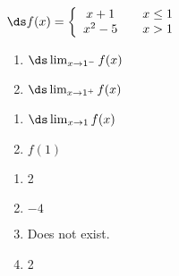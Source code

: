 {$\ds f(x) = \left\{\begin{array}{ccc}
	x+1 & & x\leq 1 \\
	x^2-5 & & x>1
	\end{array}
	\right.
$

\noindent\begin{minipage}[t]{.5\linewidth}
\begin{enumerate}
\item		$\ds \lim_{x\to 1^-} f(x)$
\item		$\ds \lim_{x\to 1^+} f(x)$
\end{enumerate}
\end{minipage}
\noindent\begin{minipage}[t]{.5\linewidth}
\begin{enumerate}\addtocounter{enumii}{2}
\item		$\ds \lim_{x\to 1} f(x)$
\item		$f(1)$\end{enumerate}
\end{minipage}
}
{\begin{enumerate}
\item		2
\item		$-4$
\item		Does not exist.
\item		2
\end{enumerate}
}


